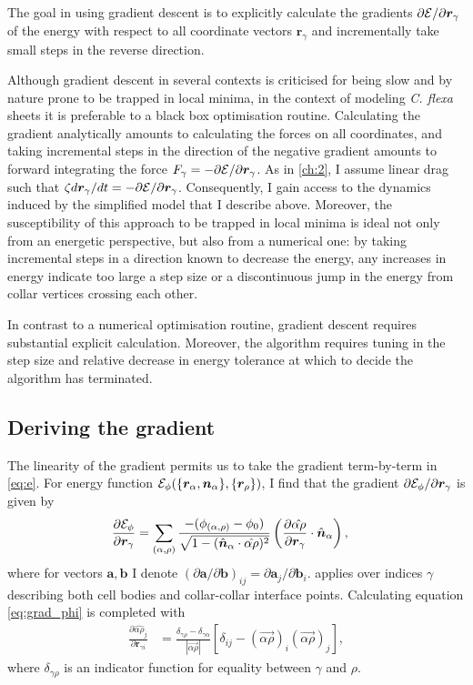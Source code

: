 The goal in using gradient descent is to explicitly calculate the gradients $\partial \mathcal{E} / \partial \bm{r}_\gamma$ of the energy with respect to all coordinate vectors $\bm{r}_\gamma$ and incrementally take small steps in the reverse direction. 

Although gradient descent in several contexts is criticised for being slow and by nature prone to be trapped in local minima, in the context of modeling \textit{C. flexa} sheets it is preferable to a black box optimisation routine. 
Calculating the gradient analytically amounts to calculating the forces on all coordinates, and taking incremental steps in the direction of the negative gradient amounts to forward integrating the force $F_\gamma = - \partial\mathcal{E}/\partial\bm{r}_\gamma$. 
As in \cref{ch:2}, I assume linear drag such that $\zeta d\bm{r}_\gamma/dt = -\partial\mathcal{E}/\partial\bm{r}_\gamma$. 
Consequently, I gain access to the dynamics induced by the simplified model that I describe above. 
Moreover, the susceptibility of this approach to be trapped in local minima is ideal not only from an energetic perspective, but also from a numerical one: by taking incremental steps in a direction known to decrease the energy, any increases in energy indicate too large a step size or a discontinuous jump in the energy from collar vertices crossing each other.

In contrast to a numerical optimisation routine, gradient descent requires substantial explicit calculation. Moreover, the algorithm requires tuning in the step size and relative decrease in energy tolerance at which to decide the algorithm has terminated. 

\subsection{Deriving the gradient}

The linearity of the gradient permits us to take the gradient term-by-term in \cref{eq:e}.
For energy function $\mathcal{E}_\phi(\{ \bm{r}_\alpha, \bm{n}_\alpha\}, \{\bm{r}_\rho\})$, I find that the gradient $\partial \mathcal{E}_\phi / \partial \bm{r}_\gamma$ is given by 
\begin{align}
	\frac{\partial\mathcal{E}_\phi}{\partial\bm{r}_\gamma} &= \sum_{(\alpha,\rho)} \frac{-(\phi_{(\alpha,\rho)} - \phi_0)}{\sqrt{1-(\hat{\bm{n}}_\alpha \cdot \hat{\alpha\rho})^2}} \left(\frac{\partial\hat{\alpha\rho}}{\partial\bm{r}_\gamma} \cdot \hat{\bm{n}}_\alpha \right), \label{eq:grad_phi}
\end{align}
\noindent where for vectors $\bm{a}, \bm{b}$ I denote $(\partial\bm{a}/\partial\bm{b})_{ij} = \partial\bm{a}_j /\partial\bm{b}_i$.
 applies over indices $\gamma$ describing both cell bodies and collar-collar interface points.
Calculating equation \cref{eq:grad_phi} is completed with
\begin{align}
	\frac{\partial \hat{\alpha\rho}_j}{\partial\bm{r}_{\gamma i}} &= \frac{\delta_{\gamma\rho}-\delta_{\gamma\alpha}}{|\vec{\alpha\rho}|} \left[\delta_{ij} - (\vec{\alpha\rho})_i(\vec{\alpha\rho})_j \right], \label{eq:dap_dr}
\end{align}
where $\delta_{\gamma\rho}$ is an indicator function for equality between $\gamma$ and $\rho$. 

